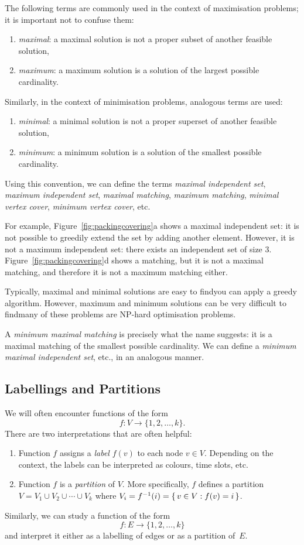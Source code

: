 The following terms are commonly used in the context of maximisation problems; it is important not to confuse them:
\begin{enumerate}
    \item \emph{maximal}: a maximal solution is not a proper subset of another feasible solution,
    \item \emph{maximum}: a maximum solution is a solution of the largest possible cardinality.
\end{enumerate}
Similarly, in the context of minimisation problems, analogous terms are used:
\begin{enumerate}
    \item \emph{minimal}: a minimal solution is not a proper superset of another feasible solution,
    \item \emph{minimum}: a minimum solution is a solution of the smallest possible cardinality.
\end{enumerate}
Using this convention, we can define the terms \emph{maximal independent set}, \emph{maximum independent set}, \emph{maximal matching}, \emph{maximum matching}, \emph{minimal vertex cover}, \emph{minimum vertex cover}, etc.

For example, Figure~\ref{fig:packingcovering}a shows a maximal independent set: it is not possible to greedily extend the set by adding another element. However, it is not a maximum independent set: there exists an independent set of size $3$. Figure~\ref{fig:packingcovering}d shows a matching, but it is not a maximal matching, and therefore it is not a maximum matching either.

Typically, maximal and minimal solutions are easy to find\mydash you can apply a greedy algorithm. However, maximum and minimum solutions can be very difficult to find\mydash many of these problems are NP-hard optimisation problems.

A \emph{minimum maximal matching} is precisely what the name suggests: it is a maximal matching of the smallest possible cardinality. We can define a \emph{minimum maximal independent set}, etc., in an analogous manner.


\subsection{Labellings and Partitions}\label{ssec:partitions}

We will often encounter functions of the form \[f\colon V \to \{1,2,\dotsc,k\}.\] There are two interpretations that are often helpful:
\begin{enumerate}[label=(\roman*)]
    \item Function $f$ assigns a \emph{label} $f(v)$ to each node $v \in V$. Depending on the context, the labels can be interpreted as colours, time slots, etc.
    \item Function $f$ is a \emph{partition} of $V$. More specifically, $f$ defines a partition $V = V_1 \cup V_2 \cup \dotsb \cup V_k$ where $V_i = f^{-1}(i) = \{\,  v \in V : f(v) = i  \,\}$.
\end{enumerate}
Similarly, we can study a function of the form \[f\colon E \to \{1,2,\dotsc,k\}\] and interpret it either as a labelling of edges or as a partition of~$E$.

